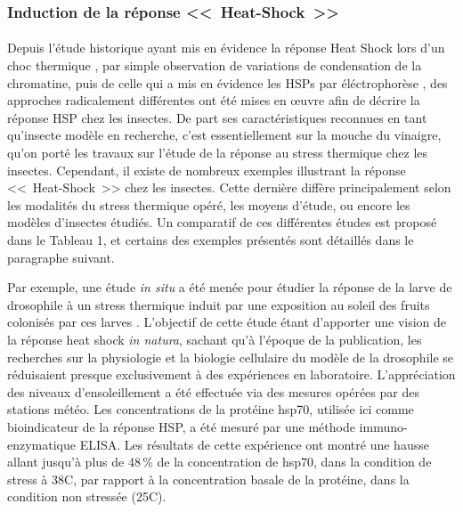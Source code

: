 		\subsubsection{Induction de la réponse <<~Heat-Shock~>>}
		\paragraph*{}


		Depuis l'étude historique ayant mis en évidence la réponse Heat Shock lors d'un choc thermique \cite{ritossa1996}, par simple observation de variations de condensation de la chromatine, puis de celle qui a mis en évidence les HSPs par éléctrophorèse \cite{tissieres1974}, des approches radicalement différentes ont été mises en \oe{}uvre afin de décrire la réponse HSP chez les  insectes.
		De part ses caractéristiques reconnues en tant qu'insecte modèle en recherche, c'est essentiellement sur la mouche du vinaigre,  qu'on porté les travaux sur l’étude de la réponse au stress thermique chez les insectes.
		Cependant, il existe de nombreux exemples illustrant la réponse <<~Heat-Shock~>> chez les insectes.
		Cette dernière diffère principalement selon les modalités du stress thermique opéré, les moyens d'étude,  ou encore les modèles d'insectes étudiés. Un comparatif de ces différentes études est proposé dans le Tableau 1, et certains des exemples présentés sont détaillés dans le paragraphe suivant.


		Par exemple, une étude \textit{in situ} a été menée pour étudier la réponse de la larve de drosophile à un stress thermique induit par une exposition au soleil des fruits colonisés par ces larves \cite{feder1997}.
		L'objectif de cette étude étant d'apporter une vision de la réponse heat shock \textit{in natura}, sachant qu'à l'époque de la publication, les recherches sur la physiologie et la biologie cellulaire du modèle de la drosophile se réduisaient presque exclusivement à des expériences en laboratoire.
		L'appréciation des niveaux d'ensoleillement a été effectuée via des mesures opérées par des stations météo.
		Les concentrations de la protéine hsp70, utilisée ici comme bioindicateur de la réponse HSP, a été mesuré par une méthode immuno-enzymatique ELISA. 
		Les résultats de cette expérience ont montré une hausse allant jusqu'à plus de 48\,\% de la concentration de hsp70, dans la condition de stress à 38\textdegree{}C, par rapport à la concentration basale de la protéine, dans la condition non stressée (25\textdegree{}C).

